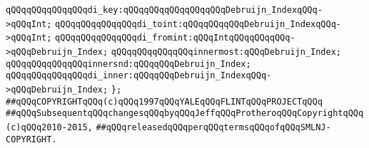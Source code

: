 \verb|qQQqqQQqqQQqqQQqdi_key:qQQqqQQqqQQqqQQqqQQqDebruijn_IndexqQQq->qQQqInt;|\newline
\verb|qQQqqQQqqQQqqQQqdi_toint:qQQqqQQqqQQqDebruijn_IndexqQQq->qQQqInt;|\newline
\verb|qQQqqQQqqQQqqQQqdi_fromint:qQQqIntqQQqqQQqqQQq->qQQqDebruijn_Index;|\newline
\newline
\verb|qQQqqQQqqQQqqQQqinnermost:qQQqDebruijn_Index;|\newline
\verb|qQQqqQQqqQQqqQQqinnersnd:qQQqqQQqDebruijn_Index;|\newline
\verb|qQQqqQQqqQQqqQQqdi_inner:qQQqqQQqDebruijn_IndexqQQq->qQQqDebruijn_Index;|\newline
\verb|};|\newline
\newline
\newline
\newline
\newline
\verb|##qQQqCOPYRIGHTqQQq(c)qQQq1997qQQqYALEqQQqFLINTqQQqPROJECTqQQq|\newline
\verb|##qQQqSubsequentqQQqchangesqQQqbyqQQqJeffqQQqProtheroqQQqCopyrightqQQq(c)qQQq2010-2015,|\newline
\verb|##qQQqreleasedqQQqperqQQqtermsqQQqofqQQqSMLNJ-COPYRIGHT.|\newline

